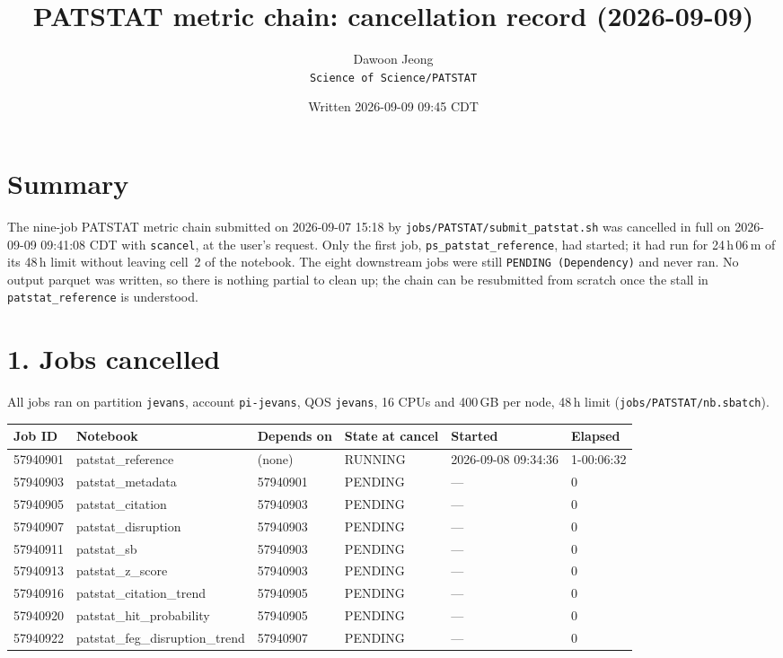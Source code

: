 \documentclass[11pt]{article}
\title{PATSTAT metric chain: cancellation record (2026-09-09)}
\author{Dawoon Jeong \\ \small \texttt{Science of Science/PATSTAT}}
\date{Written 2026-09-09 09:45 CDT}
\begin{document}
\maketitle

\section*{Summary}

The nine-job PATSTAT metric chain submitted on 2026-09-07 15:18 by
\texttt{jobs/PATSTAT/submit\_patstat.sh} was cancelled in full on
2026-09-09 09:41:08 CDT with \texttt{scancel}, at the user's request.
Only the first job, \texttt{ps\_patstat\_reference}, had started; it had run for
24\,h\,06\,m of its 48\,h limit without leaving cell~2 of the notebook.
The eight downstream jobs were still \texttt{PENDING (Dependency)} and never ran.
No output parquet was written, so there is nothing partial to clean up; the chain can be
resubmitted from scratch once the stall in \texttt{patstat\_reference} is understood.

\section*{1. Jobs cancelled}

All jobs ran on partition \texttt{jevans}, account \texttt{pi-jevans}, QOS \texttt{jevans},
16 CPUs and 400\,GB per node, 48\,h limit (\texttt{jobs/PATSTAT/nb.sbatch}).

\begin{center}
\small
\begin{tabular}{llllll}
\toprule
Job ID & Notebook & Depends on & State at cancel & Started & Elapsed \\
\midrule
57940901 & patstat\_reference            & (none)   & RUNNING & 2026-09-08 09:34:36 & 1-00:06:32 \\
57940903 & patstat\_metadata             & 57940901 & PENDING & --- & 0 \\
57940905 & patstat\_citation             & 57940903 & PENDING & --- & 0 \\
57940907 & patstat\_disruption           & 57940903 & PENDING & --- & 0 \\
57940911 & patstat\_sb                   & 57940903 & PENDING & --- & 0 \\
57940913 & patstat\_z\_score             & 57940903 & PENDING & --- & 0 \\
57940916 & patstat\_citation\_trend      & 57940905 & PENDING & --- & 0 \\
57940920 & patstat\_hit\_probability     & 57940905 & PENDING & --- & 0 \\
57940922 & patstat\_feg\_disruption\_trend & 57940907 & PENDING & --- & 0 \\
\bottomrule
\end{tabular}
\end{center}
\end{document}
